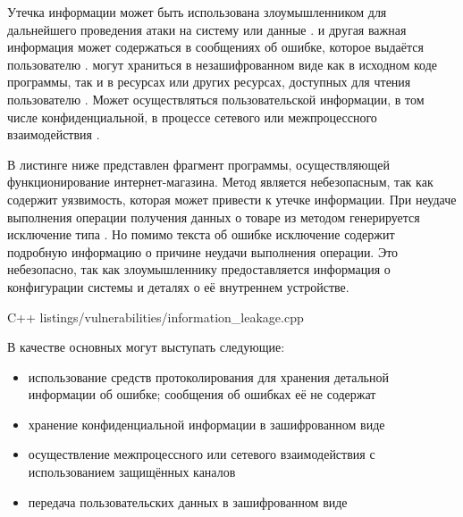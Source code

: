 

%
Утечка информации может быть использована злоумышленником для дальнейшего проведения атаки на систему или данные . 
%
 и другая важная информация может содержаться в сообщениях об ошибке, которое выдаётся пользователю . 
%
 могут храниться в незашифрованном виде как в исходном коде программы, так и в ресурсах или других ресурсах, доступных для чтения пользователю . 
%
Может осуществляться  пользовательской  информации, в том числе конфиденциальной, в процессе сетевого или межпроцессного взаимодействия .

%
В листинге ниже представлен фрагмент программы, осуществляющей функционирование интернет-магазина. 
%
Метод  является небезопасным, так как содержит уязвимость, которая может привести к утечке информации.
%
При неудаче выполнения операции получения данных о товаре из  методом генерируется исключение типа . 
%
Но помимо текста об ошибке исключение содержит подробную информацию о причине неудачи выполнения операции. 
%
Это небезопасно, так как злоумышленнику предоставляется информация о конфигурации системы и деталях о её внутреннем устройстве. 

	{C++}
	{listings/vulnerabilities/information_leakage.cpp}

%
В качестве основных  могут выступать следующие:
\begin{itemize}
	
	\item использование средств протоколирования для хранения детальной информации об ошибке; сообщения об ошибках её не содержат

	\item хранение конфиденциальной информации в зашифрованном виде
	
	\item осуществление межпроцессного или сетевого взаимодействия с использованием защищённых каналов
	
	\item передача пользовательских данных в зашифрованном виде
\end{itemize}

